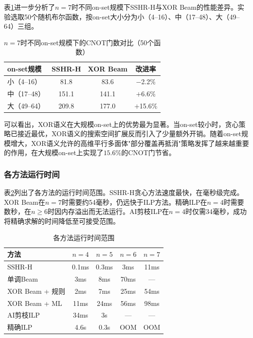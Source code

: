 \documentclass[10.5pt,compsoc,UTF8]{CjC}
\newcommand{\heiti}{\CJKfamily{STHeiti}}
\theoremstyle{mystyle}
\begin{document}
表\ref{tab:n7-onset}进一步分析了$n=7$时不同on-set规模下SSHR-H与XOR Beam的性能差异。实验选取50个随机布尔函数，按on-set大小分为小（4--16）、中（17--48）、大（49--64）三组。

\begin{table}[H]
  \centering
  \caption{$n=7$时不同on-set规模下的CNOT门数对比（50个函数）}
  \label{tab:n7-onset}
  \begin{tabular}{lccc}
    \toprule
    on-set规模 & SSHR-H & XOR Beam & 改进率 \\
    \midrule
    小（4--16） & 81.8 & 83.6 & $-$2.2\% \\
    中（17--48） & 151.1 & 141.1 & $+$6.6\% \\
    大（49--64） & 209.8 & 177.0 & $+$15.6\% \\
    \bottomrule
  \end{tabular}
\end{table}

可以看出，XOR语义在大规模on-set上的优势最为显著。当on-set较小时，贪心策略已接近最优，XOR语义的搜索空间扩展反而引入了少量额外开销。随着on-set规模增大，XOR语义允许的高维平行多面体"部分覆盖再抵消"策略发挥了越来越重要的作用，在大规模on-set上实现了$15.6\%$的CNOT门节省。

\subsubsection*{\heiti 各方法运行时间}

表\ref{tab:ai-sshr-speed}列出了各方法的运行时间范围。SSHR-H贪心方法速度最快，在毫秒级完成。XOR Beam在$n=7$时需要约54毫秒，仍远快于ILP方法。精确ILP在$n=4$时需要数秒，在$n \ge 6$时因内存溢出而无法运行。AI剪枝ILP在$n=4$时仅需34毫秒，成功将精确求解的时间降低至可接受范围。

\begin{table}[H]
  \centering
  \caption{各方法运行时间范围}
  \label{tab:ai-sshr-speed}
  \setlength{\tabcolsep}{5pt}
  \begin{tabular}{lcccc}
    \toprule
    方法 & $n{=}4$ & $n{=}5$ & $n{=}6$ & $n{=}7$ \\
    \midrule
    SSHR-H & 0.1ms & 0.3ms & 3ms & 11ms \\
    单调Beam & 3ms & 8ms & 70ms & --- \\
    XOR Beam + 规则 & 2ms & 7ms & 25ms & 54ms \\
    XOR Beam + ML & 11ms & 24ms & 56ms & 98ms \\
    AI剪枝ILP & 34ms & 3s & --- & --- \\
    精确ILP & 4.6s & 0.3s & OOM & OOM \\
    \bottomrule
  \end{tabular}
\end{table}
\end{document}
